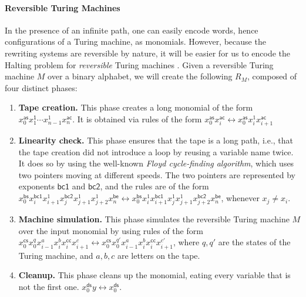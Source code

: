 \paragraph{Reversible Turing Machines}
\AP In the presence of an infinite path, one can easily encode words, hence
configurations of a Turing machine, as monomials. However, because the
rewriting systems are reversible by nature, it will be easier for us to encode
the Halting problem for \emph{reversible} Turing machines \cite{BENN73}.
Given a reversible Turing machine $M$ over a binary alphabet, we will
create the following  $R_M$, composed of
four distinct phases:
\begin{enumerate}
  \item \label{item:undecidability-1}
    \textbf{Tape creation.} This phase creates a long monomial 
    of the form $x_0^{\mathsf{as}} x_1^{\mathsf{1}} \cdots x_{n-1}^{1} x_n^{\mathsf{ac}}$.
    It is obtained via rules of the form
    $x_0^{\mathsf{as}} x_i^{\mathsf{ac}} \leftrightarrow x_0^{\mathsf{as}} x_i^{1} x_{i+1}^{\mathsf{ac}}$
  \item \label{item:undecidability-2}
    \textbf{Linearity check.}
    This phase ensures that the tape is a long path, i.e., that the tape creation
    did not introduce a loop by reusing a variable name twice.
    It does so by using the well-known \emph{Floyd cycle-finding algorithm},
    which uses two pointers moving at different speeds.
    The two pointers are represented by exponents $\mathsf{bc1}$ and $\mathsf{bc2}$,
    and the rules are of the form
    $x_0^{\mathsf{bs}} x_i^{\mathsf{bc1}} x_{i+1}^1 x_j^{\mathsf{bc2}} x_{j+1}^1 x_{j+2}^1 x_n^{\mathsf{be}} \leftrightarrow 
     x_0^{\mathsf{bs}} x_i^{1} 
     x_{i+1}^{\mathsf{bc1}}
     x_j^{1} 
     x_{j+1}^{1} 
     x_{j+2}^{\mathsf{bc2}}
     x_{n}^{\mathsf{be}}$,
     whenever $x_j \neq x_i$.
  \item \label{item:undecidability-3}
    \textbf{Machine simulation.}
    This phase simulates the reversible Turing machine $M$ over the input monomial
    by using rules of the form
    $x_0^{\mathsf{cs}} x_0^{q} x_{i-1}^{a} x_i^{b} x_{i}^{\mathsf{cc}} x_{i+1}^{c}
    \leftrightarrow
    x_0^{\mathsf{cs}} x_0^{q'} x_{i-1}^{a} x_i^{b} x_{i}^{\mathsf{cc}} x_{i+1}^{c'}$,
    where $q,q'$ are the states of the Turing machine, and $a,b,c$ are letters
    on the tape.

  \item \label{item:undecidability-4}
    \textbf{Cleanup.}
    This phase cleans up the monomial, eating every variable that is 
    not the first one.
    $x_0^{\mathsf{ds}} y \leftrightarrow x_0^{\mathsf{ds}}$.
\end{enumerate}
